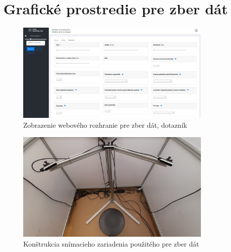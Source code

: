 \newpage
\section{Grafické prostredie pre zber dát} \label{sec:Priloha:HMI_WEB}

\begin{figure}[H]
	\centering
	\includegraphics[width=0.85\textwidth]{figures/hmi_web3.png}
	\caption{Zobrazenie webového rozhranie pre zber dát, dotazník}
	\label{fig:hmi_web:c}
\end{figure}

\begin{figure}[H]
	\centering
	\includegraphics[width=0.85\textwidth]{figures/clinic_scaning.png}
	\caption{Konštrukcia snímacieho zariadenia použitého pre zber dát \cite{ffff}}
	\label{fig:hmi_web:d}
\end{figure}
